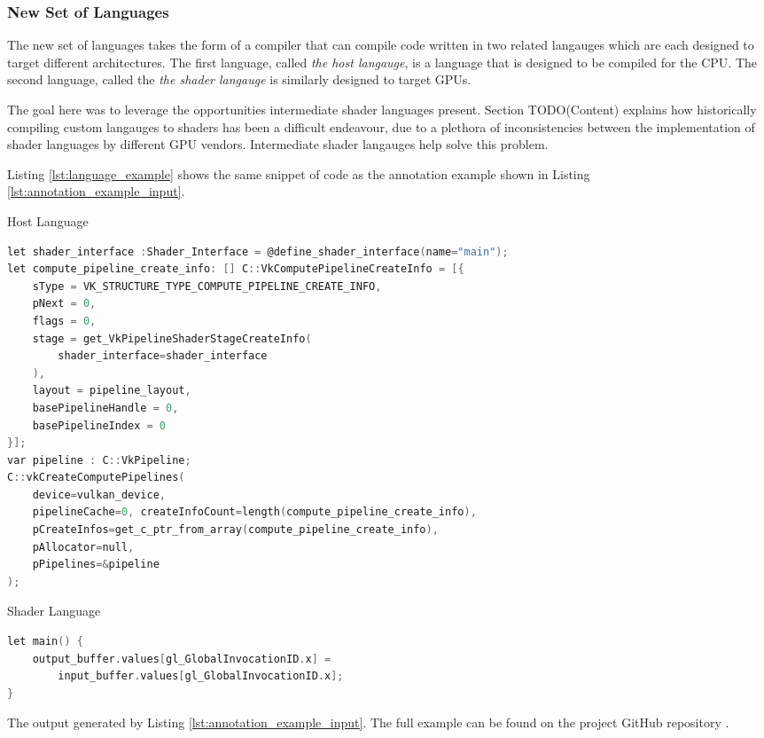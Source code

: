\documentclass[a4paper,12pt,twoside,openright]{report}
\begin{document}
\subsubsection{New Set of Languages}

The new set of languages takes the form of a compiler that can compile code
written in two related langauges which are each designed to target different
architectures. The first language, called \textit{the host langauge}, is a
language that is designed to be compiled for the CPU. The second language,
called the \textit{the shader langauge} is similarly designed to target GPUs.

The goal here was to leverage the opportunities intermediate shader languages
present. Section TODO(Content) explains how historically compiling custom langauges to
shaders has been a difficult endeavour, due to a plethora of inconsistencies
between the implementation of shader languages by different GPU vendors.
Intermediate shader langauges help solve this problem.


Listing \ref{lst:language_example} shows the same snippet of code as the
annotation example shown in Listing \ref{lst:annotation_example_input}.

\begin{lstfloat}
\begin{center} Host Language \end{center}
\begin{lstlisting}[language=C]
let shader_interface :Shader_Interface = @define_shader_interface(name="main");
let compute_pipeline_create_info: [] C::VkComputePipelineCreateInfo = [{
    sType = VK_STRUCTURE_TYPE_COMPUTE_PIPELINE_CREATE_INFO,
    pNext = 0,
    flags = 0,
    stage = get_VkPipelineShaderStageCreateInfo(
        shader_interface=shader_interface
    ),
    layout = pipeline_layout,
    basePipelineHandle = 0,
    basePipelineIndex = 0
}];
var pipeline : C::VkPipeline;
C::vkCreateComputePipelines(
    device=vulkan_device,
    pipelineCache=0, createInfoCount=length(compute_pipeline_create_info),
    pCreateInfos=get_c_ptr_from_array(compute_pipeline_create_info),
    pAllocator=null,
    pPipelines=&pipeline
);
\end{lstlisting}
\begin{center}
Shader Language
\end{center}
\begin{lstlisting}[language=C]
let main() {
    output_buffer.values[gl_GlobalInvocationID.x] =
        input_buffer.values[gl_GlobalInvocationID.x];
}
\end{lstlisting}
\caption{The output generated by Listing \ref{lst:annotation_example_input}. The full
example can be found on the project GitHub repository \cite{ProjectSource}.}
\label{lst:language_example}
\end{lstfloat}
\end{document}
